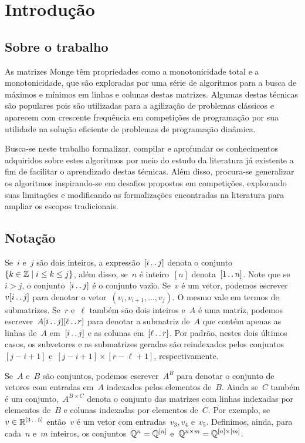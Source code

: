 \chapter{Introdução}
\label{Introducao}

\section{Sobre o trabalho}
As matrizes Monge têm propriedades como a monotonicidade total e a monotonicidade, que são exploradas por uma série de algoritmos para a busca de máximos e mínimos em linhas e colunas destas matrizes. Algumas destas técnicas são populares pois são utilizadas para a agilização de problemas clássicos e aparecem com crescente frequência em competições de programação por sua utilidade na solução eficiente de problemas de programação dinâmica.

Busca-se neste trabalho formalizar, compilar e aprofundar os conhecimentos adquiridos sobre estes algoritmos por meio do estudo da literatura já existente a fim de facilitar o aprendizado destas técnicas. Além disso, procura-se generalizar os algoritmos inspirando-se em desafios propostos em competições, explorando suas limitações e modificando as formalizações encontradas na literatura para ampliar os escopos tradicionais. 

\section{Notação}
Se~$i$ e~$j$ são dois inteiros, a expressão~$[i \,.\,.\, j]$ denota o conjunto~${ \{ k \in \mathbb{Z} \mid i \leq k \leq j \} }$, além disso, se~$n$ é inteiro~$[n]$ denota~$[1 \,.\,.\, n]$. Note que se~$i > j$, o conjunto~$[i \,.\,.\, j]$ é o conjunto vazio. Se~$v$ é um vetor, podemos escrever~$v[i \,.\,.\, j]$ para denotar o vetor~${ (v_i, v_{i+1}, \dots, v_j) }$. O mesmo vale em termos de submatrizes. Se~$r$ e~$\ell$ também são dois inteiros e~$A$ é uma matriz, podemos escrever~$A[i \,.\,.\, j][\ell \,.\,.\, r]$ para denotar a submatriz de~$A$ que contém apenas as linhas de~$A$ em~$[i \,.\,.\, j]$ e as colunas em~$[\ell \,.\,.\, r]$. Por padrão, nestes dois últimos casos, os subvetores e as submatrizes geradas são reindexados pelos conjuntos~$[j - i + 1]$ e~${ [j - i + 1] \times [r - \ell + 1] }$, respectivamente.

Se~$A$ e~$B$ são conjuntos, podemos escrever~$A^B$ para denotar o conjunto de vetores com entradas em~$A$ indexados pelos elementos de~$B$. Ainda se~$C$ também é um conjunto,~$A^{B \times C}$ denota o conjunto das matrizes com linhas indexadas por elementos de~$B$ e colunas indexadas por elementos de~$C$. Por exemplo, se~$v \in \mathbb{R}^{ [3 \,.\,.\, 5] }$ então~$v$ é um vetor com entradas~${ v_3, v_4 }$ e~$v_5$. Definimos, ainda, para cada~$n$ e~$m$ inteiros, os conjuntos~${ \mathbb{Q}^n = \mathbb{Q}^{ [n] } }$ e~${ \mathbb{Q}^{n \times m} = \mathbb{Q}^{[n] \times [m]} }$.

